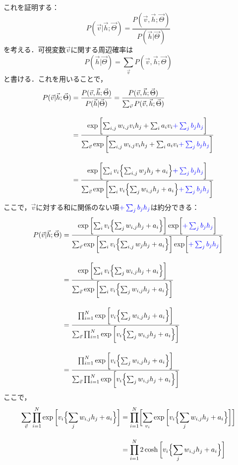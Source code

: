 これを証明する：
\begin{equation}
    P(\vec{v}|\vec{h};\vec{\Theta}) = \frac{P(\vec{v},\vec{h};\vec{\Theta})}{P(\vec{h}|\vec{\Theta})}
\end{equation}
を考える．可視変数$\vec{v}$に関する周辺確率は
\begin{equation}
    P(\vec{h}|\vec{\Theta}) = \sum_{\vec{v}}P(\vec{v},\vec{h};\vec{\Theta})
\end{equation}
と書ける．これを用いることで，
\begin{align}
    P(\vec{v}|\vec{h};\vec{\Theta}) 
    &= \frac{P(\vec{v},\vec{h};\vec{\Theta})}{P(\vec{h}|\vec{\Theta})}
    = \frac{P(\vec{v},\vec{h};\vec{\Theta})}{\sum_{\vec{v}}P(\vec{v},\vec{h};\vec{\Theta})}\nn[10pt]
    &=\frac{\exp{\biggl[\sum_{i,j}w_{i,j} v_i h_j  +\sum_{i} a_{i} v_i
    \textcolor{blue}{+\sum_{j} b_{j}h_j}
    \biggr]}}
    {\sum_{\vec{v}}\exp{\biggl[\sum_{i,j}w_{i,j} v_i h_j  +\sum_{i} a_{i} v_i
    \textcolor{blue}{+\sum_{j} b_{j}h_j} 
    \biggr]}}\nn[10pt]
    &=\frac{\exp{\biggl[\sum_{i}v_i\Bigl\{\sum_{i,j}w_{j}  h_j  + a_{i}\Bigr\}
    \textcolor{blue}{+\sum_{j} b_{j}h_j}
    \biggr]}}
    {\sum_{\vec{v}}\exp{\biggl[\sum_{i}v_i\Bigl\{\sum_{j}w_{i,j}  h_j  + a_{i}\Bigr\}
    \textcolor{blue}{+\sum_{j} b_{j}h_j}
    \biggr]}}
\end{align}
ここで，$\vec{v}$に対する和に関係のない項$\textcolor{blue}{+\sum_{j} b_{j}h_j}$は約分できる：
\begin{align}
    P(\vec{v}|\vec{h};\vec{\Theta}) 
    &=\frac{\exp{\biggl[\sum_{i}v_i\Bigl\{\sum_{j}w_{i,j}  h_j  + a_{i}\Bigr\}\biggr]
    \exp\biggl[\textcolor{blue}{+\sum_{j} b_{j}h_j}
    \biggr]}}
    {\sum_{\vec{v}}\exp{\biggl[\sum_{i}v_i\Bigl\{\sum_{i,j}w_{j}  h_j  + a_{i}\Bigr\}\biggr]
    \exp\biggl[\textcolor{blue}{+\sum_{j} b_{j}h_j}
    \biggr]}}\nn[10pt]
    &=\frac{\exp{\biggl[\sum_{i}v_i\Bigl\{\sum_{j}w_{i,j}  h_j  + a_{i}\Bigr\}
    \biggr]}}
    {\sum_{\vec{v}}\exp{\biggl[\sum_{i}v_i\Bigl\{\sum_{j}w_{i,j}  h_j  + a_{i}\Bigr\}
    \biggr]}}\nn[10pt]
    &=\frac{\prod_{i=1}^{N}\exp{\biggl[v_i\Bigl\{\sum_{j}w_{i,j}  h_j  + a_{i}\Bigr\}
    \biggr]}}
    {\sum_{\vec{v}}\prod_{i=1}^{N}\exp{\biggl[v_i\Bigl\{\sum_{j}w_{i,j}  h_j  + a_{i}\Bigr\}
    \biggr]}}\nn[10pt]
    &=\frac{\prod_{i=1}^{N}\exp{\biggl[v_i\Bigl\{\sum_{j}w_{i,j}  h_j  + a_{i}\Bigr\}
    \biggr]}}
    {\sum_{\vec{v}}\prod_{i=1}^{N}\exp{\biggl[v_i\Bigl\{\sum_{j}w_{i,j}  h_j  + a_{i}\Bigr\}
    \biggr]}}
\end{align}
ここで，
\begin{align}
    \sum_{\vec{v}}\prod_{i=1}^{N}\exp{\biggl[v_i\Bigl\{\sum_{j}w_{i,j}  h_j  + a_{i}\Bigr\}
    \biggr]}
    &=\prod_{i=1}^{N}\biggl[
    \sum_{v_i}\exp{\biggl[v_i\Bigl\{\sum_{j}w_{i,j}  h_j  + a_{i}\Bigr\}
    \biggr]
    \biggr]}\nn[10pt]
    &=\prod_{i=1}^{N}
    2\cosh{\biggl[v_i\Bigl\{\sum_{j}w_{i,j}  h_j  + a_{i}\Bigr\}
    \biggr]}
\end{align}


